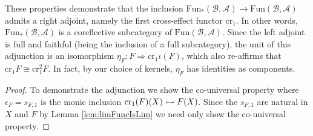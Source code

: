 These properties demonstrate that the inclusion $\text{Fun}_*(\mathcal{B},\mathcal{A})\rightarrow \text{Fun}(\mathcal{B},\mathcal{A})$ admits a right adjoint, namely the first cross-effect functor $\text{cr}_1$. In other words, $\text{Fun}_*(\mathcal{B},\mathcal{A})$ is a coreflective subcategory of $\text{Fun}(\mathcal{B},\mathcal{A})$. Since the left adjoint is full and faithful (being the inclusion of a full subcategory), the unit of this adjunction is an isomorphism $\eta_F:F\Rightarrow \text{cr}_1\iota(F)$, which also re-affirms that $\text{cr}_1F\cong \text{cr}_1^2F$. In fact, by our choice of kernels, $\eta_F$ has identities as components.
\begin{proof}
    To demonstrate the adjunction we show the co-universal property where $\epsilon_F = s_{F,1}$ is the monic inclusion $\text{cr}_1(F)(X)\rightarrowtail F(X)$. Since the $s_{F,1}$ are natural in $X$ and $F$ by Lemma \ref{lem:limFuncIsLim} we need only show the co-universal property.


\end{proof}
